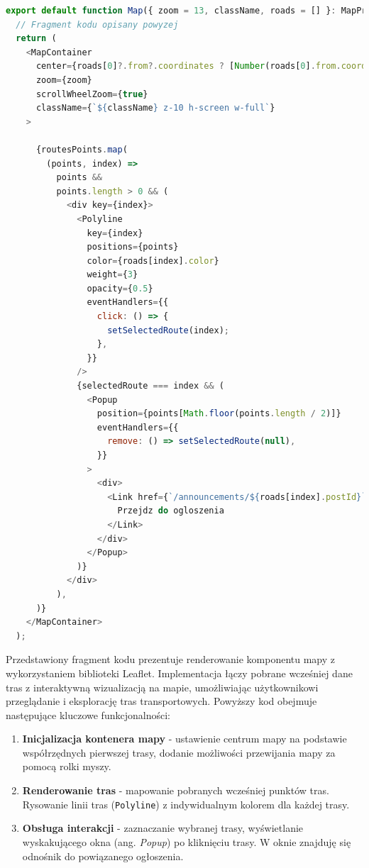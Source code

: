   {\belowcaptionskip=-9pt
  \begin{lstlisting}[language=JavaScript,caption=Rysowanie tras na mapi, label=lst:drawRoutes]
  export default function Map({ zoom = 13, className, roads = [] }: MapProps) {
  // Fragment kodu opisany powyzej
  return (
    <MapContainer
      center={roads[0]?.from?.coordinates ? [Number(roads[0].from.coordinates[0]), Number(roads[0].from.coordinates[1])] : undefined}
      zoom={zoom}
      scrollWheelZoom={true}
      className={`${className} z-10 h-screen w-full`}
    >
      
      {routesPoints.map(
        (points, index) =>
          points &&
          points.length > 0 && (
            <div key={index}>
              <Polyline
                key={index}
                positions={points}
                color={roads[index].color}
                weight={3}
                opacity={0.5}
                eventHandlers={{
                  click: () => {
                    setSelectedRoute(index);
                  },
                }}
              />
              {selectedRoute === index && (
                <Popup
                  position={points[Math.floor(points.length / 2)]}
                  eventHandlers={{
                    remove: () => setSelectedRoute(null),
                  }}
                >
                  <div>
                    <Link href={`/announcements/${roads[index].postId}`}>
                      Przejdz do ogloszenia
                    </Link>
                  </div>
                </Popup>
              )}
            </div>
          ),
      )}
    </MapContainer>
  );
\end{lstlisting}
}
Przedstawiony fragment kodu prezentuje renderowanie komponentu mapy z wykorzystaniem biblioteki Leaflet. Implementacja łączy pobrane wcześniej dane tras z interaktywną wizualizacją na mapie, umożliwiając użytkownikowi przeglądanie i eksplorację tras transportowych. Powyższy kod obejmuje następujące kluczowe funkcjonalności:
\begin{enumerate}
    \item \textbf{Inicjalizacja kontenera mapy} - ustawienie centrum mapy na podstawie współrzędnych pierwszej trasy, dodanie możliwości przewijania mapy za pomocą rolki myszy.
    \item \textbf{Renderowanie tras} - mapowanie pobranych wcześniej punktów tras. Rysowanie linii tras (\texttt{Polyline}) z indywidualnym kolorem dla każdej trasy.
    \item \textbf{Obsługa interakcji} - zaznaczanie wybranej trasy, wyświetlanie wyskakującego okna (ang. \emph{Popup}) po kliknięciu trasy. W oknie znajduję się odnośnik do powiązanego ogłoszenia.
\end{enumerate}